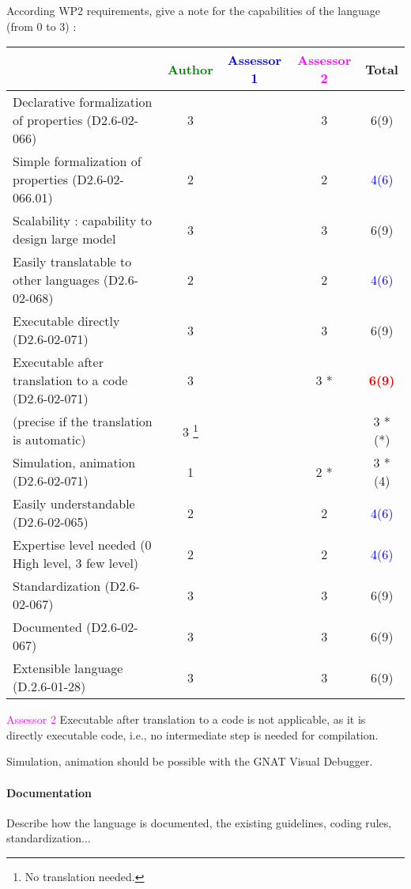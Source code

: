 According WP2 requirements, give a note for the capabilities of the language (from 0 to 3) :

\begin{tabular}{|l | c | c | c | c|}
\hline
& \textcolor{green}{Author} & \textcolor{blue}{Assessor 1} & \textcolor{magenta}{Assessor 2} & Total \\
\hline
Declarative formalization of properties (D2.6-02-066) & 3     & & 3     &  6(9) \\
\hline
Simple formalization of properties (D2.6-02-066.01) & 2     & & 2     & \textcolor{blue}{4(6)}  \\
\hline
Scalability : capability to design large model & 3     & & 3     &  6(9) \\
\hline
Easily translatable to other languages (D2.6-02-068) & 2     & & 2     & \textcolor{blue}{4(6)}  \\
\hline
Executable directly (D2.6-02-071) & 3     & & 3     &  6(9) \\
\hline
Executable after translation to a code (D2.6-02-071) & 3     & & 3    * & \textcolor{red}{\textbf{6(9)}}  \\
(precise if the translation is automatic) & 3    \footnote{No translation needed.} & & & 3 *(*) \\
\hline
Simulation, animation (D2.6-02-071) & 1     & & 2    * & 3 *(4) \\
\hline
Easily understandable (D2.6-02-065) & 2     & & 2     & \textcolor{blue}{4(6)}  \\
\hline
Expertise level needed (0 High level, 3 few level) & 2     & & 2     & \textcolor{blue}{4(6)}  \\
\hline
Standardization (D2.6-02-067) & 3     & & 3     &  6(9) \\
\hline
Documented (D2.6-02-067) & 3     & & 3     &  6(9) \\
\hline
Extensible language (D.2.6-01-28) & 3     & & 3     &  6(9) \\
\hline
\end{tabular}

\textcolor{magenta}{Assessor 2} Executable after translation to a code is not
applicable, as it is directly executable code, i.e., no intermediate step is
needed for compilation.

Simulation, animation should be possible with the GNAT Visual Debugger.


\paragraph{Documentation} Describe how the language is documented, the existing guidelines, coding rules, standardization...

